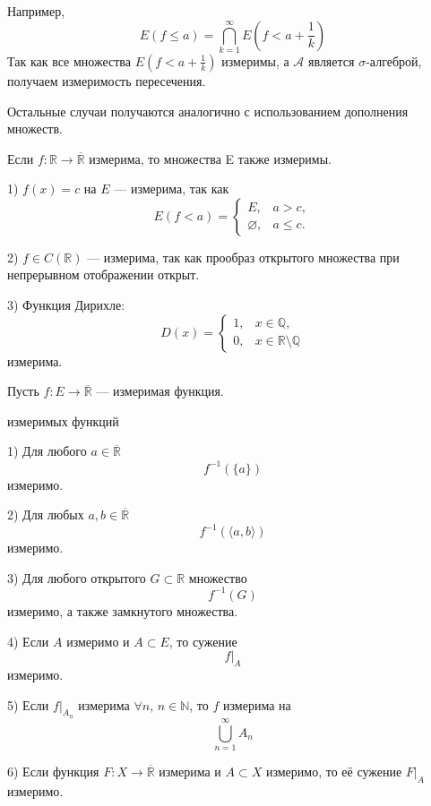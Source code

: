 \documentclass[12pt,a4paper]{article}
\begin{document}
\begin{proofbox}{}
    Например,
    \[
        E(f\leq a)=\bigcap_{k=1}^{\infty}E\left(f<a+\frac1k\right)
    \]
    Так как все множества $E(f<a+\frac1k)$ измеримы, а $\mathcal{A}$ является $\sigma$-алгеброй, получаем измеримость пересечения.

    Остальные случаи получаются аналогично с использованием дополнения множеств.
\end{proofbox}

\begin{note}
    Если $f:\mathbb{R}\to\overline{\mathbb{R}}$ измерима, то множества E также измеримы.
\end{note}

\begin{example}

    1) $f(x)=c$ на $E$ --- измерима, так как
    \[
        E(f<a)=
        \begin{cases}
            E,&a>c,\\
            \varnothing,&a\leq c.
        \end{cases}
    \]

    2) $f\in C(\mathbb{R})$ --- измерима, так как прообраз открытого множества при непрерывном отображении открыт.

    3) Функция Дирихле:
    \[
        D(x)=
        \begin{cases}
            1,&x\in\mathbb{Q},\\
            0,&x\in\mathbb{R}\setminus\mathbb{Q}
        \end{cases}
    \]
    измерима.
\end{example}

Пусть $f:E\to\overline{\mathbb{R}}$ --- измеримая функция.

\begin{props}{измеримых функций}

    1) Для любого $a\in\overline{\mathbb{R}}$
    \[
        f^{-1}(\{a\})
    \]
    измеримо.

    2) Для любых $a,b\in\overline{\mathbb{R}}$
    \[
        f^{-1}(\langle a,b\rangle)
    \]
    измеримо.

    3) Для любого открытого $G\subset\mathbb{R}$ множество
    \[
        f^{-1}(G)
    \]
    измеримо, а также замкнутого множества.

    4) Если $A$ измеримо и $A\subset E$, то сужение
    \[
        f|_A
    \]
    измеримо.

    5) Если $f|_{A_n}$ измерима $\forall n$, $n\in\mathbb{N}$, то $f$ измерима на
    \[
        \bigcup_{n=1}^{\infty}A_n
    \]

    6) Если функция $F:X\to\overline{\mathbb R}$ измерима и $A\subset X$ измеримо, то её сужение $F|_A$ измеримо.

\end{props}
\end{document}
